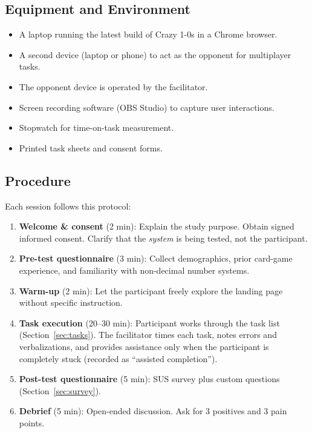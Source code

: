 \documentclass[12pt, titlepage]{article}
\begin{document}
\subsection{Equipment and Environment}

\begin{itemize}
  \item A laptop running the latest build of Crazy 1-0s in a Chrome browser.
  \item A second device (laptop or phone) to act as the opponent for multiplayer tasks.
  \item The opponent device is operated by the facilitator.
  \item Screen recording software (OBS Studio) to capture user interactions.
  \item Stopwatch for time-on-task measurement.
  \item Printed task sheets and consent forms.
\end{itemize}

\subsection{Procedure}

Each session follows this protocol:

\begin{enumerate}
  \item \textbf{Welcome \& consent} (2 min): Explain the study purpose. Obtain signed informed consent. Clarify that the \emph{system} is being tested, not the participant.
  \item \textbf{Pre-test questionnaire} (3 min): Collect demographics, prior card-game experience, and familiarity with non-decimal number systems.
  \item \textbf{Warm-up} (2 min): Let the participant freely explore the landing page without specific instruction.
  \item \textbf{Task execution} (20--30 min): Participant works through the task list (Section~\ref{sec:tasks}). The facilitator times each task, notes errors and verbalizations, and provides assistance only when the participant is completely stuck (recorded as ``assisted completion'').
  \item \textbf{Post-test questionnaire} (5 min): SUS survey plus custom questions (Section~\ref{sec:survey}).
  \item \textbf{Debrief} (5 min): Open-ended discussion. Ask for 3 positives and 3 pain points.
\end{enumerate}
\end{document}
